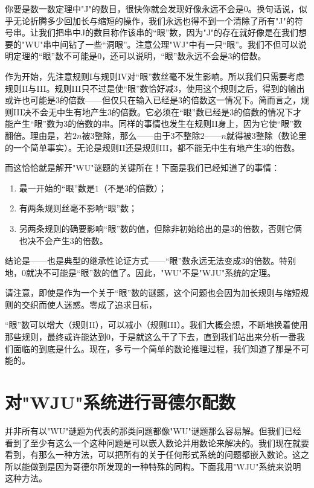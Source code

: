 你要是数一数定理中"J"的数目，很快你就会发现好像永远不会是$0$。换句话说，似乎无论折腾多少回加长与缩短的操作，我们永远也得不到一个清除了所有"J"的符号串。让我们把串中J的数目称作该串的“眼”数，因为"J"的存在就好像是在我们想要的"WU"串中间钻了一些“洞眼”。注意公理"WJ"中有一只“眼”。我们不但可以说明定理的“眼”数不可能是$0$，还可以说明，“眼”数永远不会是$3$的倍数。

作为开始，先注意规则I与规则IV对“眼”数丝毫不发生影响。所以我们只需要考虑规则II与III。规则III只不过是使“眼”数恰好减$3$，使用这个规则之后，得到的输出或许也可能是$3$的倍数——但仅只在输入已经是$3$的倍数这一情况下。简而言之，规则III决不会无中生有地产生$3$的倍数。它必须在“眼”数已经是$3$的倍数的情况下才能产生“眼”数为$3$的倍数的串。同样的事情也发生在规则II身上，因为它使“眼”数翻倍。理由是，若$2n$被$3$整除，那么——由于$3$不整除$2$——$n$就得被$3$整除（数论里的一个简单事实）。无论是规则II还是规则III，都不能无中生有地产生$3$的倍数。

而这恰恰就是解开"WU"谜题的关键所在！下面是我们已经知道了的事情：
\begin{enumerate}
\item  最一开始的“眼”数是$1$（不是$3$的倍数）；
\item 有两条规则丝毫不影响“眼”数；
\item 另两条规则的确要影响“眼”数的值，但除非初始给出的是$3$的倍数，否则它俩也决不会产生$3$的倍数。
\end{enumerate}

结论是——也是典型的继承性论证方式——“眼”数永远无法变成$3$的倍数。特别地，$0$就决不可能是“眼”数的值了。因此，"WU"不是"WJU"系统的定理。

请注意，即使是作为一个关于“眼”数的谜题，这个问题也会因为加长规则与缩短规则的交织而使人迷惑。零成了追求目标，

“眼”数可以增大（规则II），可以减小（规则III）。我们大概会想，不断地换着使用那些规则，最终或许能达到$0$，于是就这么干了下去，直到我们站出来分析一番我们面临的到底是什么。现在，多亏一个简单的数论推理过程，我们知道了那是不可能的。

\section{对"WJU"系统进行哥德尔配数}

并非所有以"WU"谜题为代表的那类问题都像"WU"谜题那么容易解。但我们已经看到了至少有这么一个这种问题是可以嵌入数论并用数论来解决的。我们现在就要看到，有那么一种方法，可以把所有的关于任何形式系统的问题都嵌入数论。这之所以能做到是因为哥德尔所发现的一种特殊的同构。下面我用"WJU"系统来说明这种方法。

